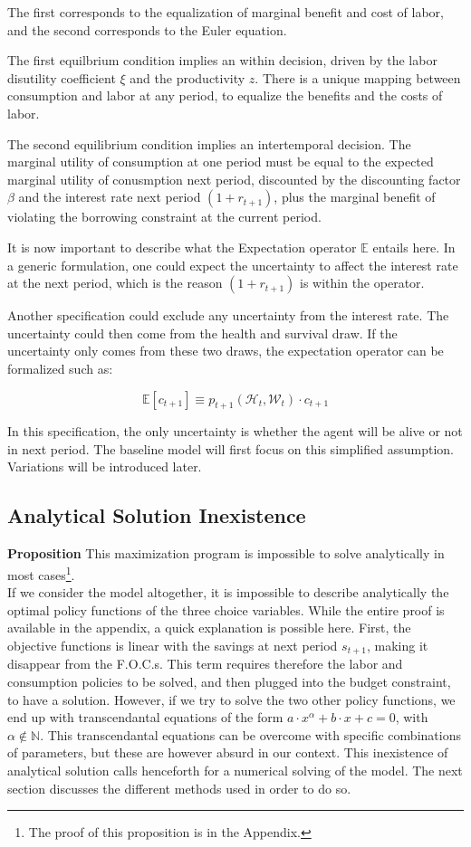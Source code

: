 \documentclass{article}
\begin{document}
The first corresponds to the equalization of marginal benefit and
cost of labor, and the second corresponds to the Euler equation.

The first equilbrium condition implies an within decision,
driven by the labor disutility coefficient $\xi$ and the productivity $z$.
There is a unique mapping between consumption and labor at any period, to 
equalize the benefits and the costs of labor.

The second equilibrium condition implies an intertemporal decision.
The marginal utility of consumption at one period must be equal to the 
expected marginal utility of conusmption next period, discounted by 
the discounting factor $\beta$ and the interest rate next period $(1+r_{t+1})$, 
plus the marginal benefit of violating the borrowing constraint at the current period. 

It is now important to describe what the Expectation operator $\mathbb{E}$ entails here. 
In a generic formulation, one could expect the uncertainty to affect the interest rate at the next period, 
which is the reason $(1+r_{t+1})$ is within the operator.

Another specification could exclude any uncertainty from 
the interest rate. 
The uncertainty could then come from the health and survival draw. 
If the uncertainty only comes from these two draws, the expectation operator can be formalized such as: 

$$\mathbb{E}\left[c_{t+1}\right] \equiv p_{t+1}(\mathcal{H}_{t},\mathcal{W}_{t}) \cdot c_{t+1}$$

In this specification, the only uncertainty is whether the agent will be alive or not in next period.
The baseline model will first focus on this simplified assumption. 
Variations will be introduced later.

\subsection{Analytical Solution Inexistence}

\textbf{Proposition}
This maximization program is impossible to solve analytically in most cases\footnote{The proof of this proposition is in the Appendix.}.
\\

If we consider the model altogether, it is impossible to describe 
analytically the optimal policy functions of the three choice variables.
While the entire proof is available in the appendix, a quick explanation
is possible here.
First, the objective functions is linear with the savings at next period $s_{t+1}$, 
making it disappear from the F.O.C.s.
This term requires therefore the labor and consumption policies to be solved, 
and then plugged into the budget constraint, to have a solution. 
However, if we try to solve the two other policy functions, 
we end up with transcendantal equations of the form $a\cdot x^{\alpha} + b\cdot x + c = 0$, 
with $\alpha\notin \mathbb{N}$. 
This transcendantal equations can be overcome with specific combinations 
of parameters, but these are however absurd in our context.
This inexistence of analytical solution calls henceforth for a numerical solving of the model.
The next section discusses the different methods used in order to do so.
\end{document}
